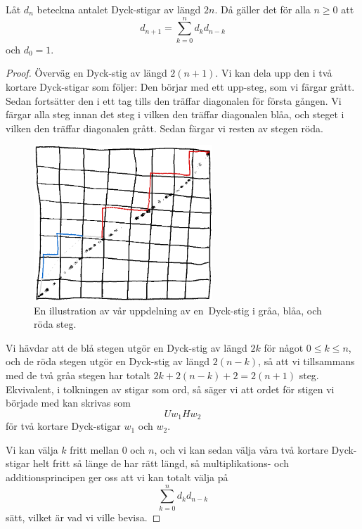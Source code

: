\documentclass[nobib]{tufte-handout}
\begin{document}
\begin{lemma}\label{dyck_path_recursion_lemma}
    Låt $d_n$ beteckna antalet Dyck-stigar av längd $2n$. Då gäller det för alla $n \geq 0$ att
    $$d_{n+1} = \sum_{k=0}^{n} d_k d_{n-k}$$
    och $d_0 = 1$.

    \begin{proof}
        Överväg en Dyck-stig av längd $2(n+1)$. Vi kan dela upp den i två kortare Dyck-stigar som följer: Den börjar med ett upp-steg, som vi färgar grått. Sedan fortsätter den i ett tag tills den träffar diagonalen för första gången. Vi färgar alla steg innan det steg i vilken den träffar diagonalen blåa, och steget i vilken den träffar diagonalen grått. Sedan färgar vi resten av stegen röda.

        \begin{figure}
            \centering
            \includegraphics[width = 0.6\textwidth]{graphics/Dyck_path_recursion.png}
            \caption{En illustration av vår uppdelning av en\, Dyck-stig i gråa, blåa, och röda steg.}
        \end{figure}

        Vi hävdar att de blå stegen utgör en Dyck-stig av längd $2k$ för något $0 \leq k \leq n$, och de röda stegen utgör en Dyck-stig av längd $2(n-k)$, så att vi tillsammans med de två gråa stegen har totalt $2k + 2(n-k) + 2 = 2(n+1)$ steg. Ekvivalent, i tolkningen av stigar som ord, så säger vi att ordet för stigen vi började med kan skrivas som
        $$Uw_1Hw_2$$
        för två kortare Dyck-stigar $w_1$ och $w_2$.

        Vi kan välja $k$ fritt mellan $0$ och $n$, och vi kan sedan välja våra två kortare Dyck-stigar helt fritt så länge de har rätt längd, så multiplikations- och additionsprincipen ger oss att vi kan totalt välja på
        $$\sum_{k=0}^{n} d_k d_{n-k}$$
        sätt, vilket är vad vi ville bevisa.
    \end{proof}
\end{lemma}
\end{document}
